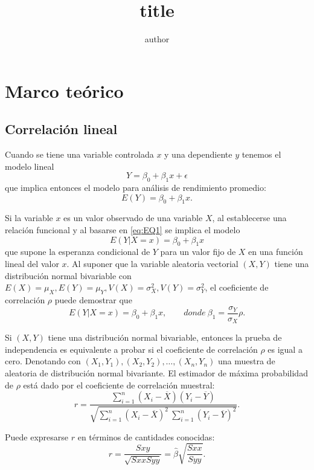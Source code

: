 \documentclass[12pt,letterpaper]{article}
\author{author}
\title{title}
\begin{document}
\section {Marco teórico}
\subsection {Correlación lineal}
Cuando se tiene una variable controlada $x$ y una dependiente $y$ tenemos el modelo lineal
\begin{equation}
Y=\beta_0+\beta_1x+\epsilon
\end{equation}
que implica entonces el modelo para análisis de rendimiento promedio:
\begin{equation}\label{eq:EQ1}
E(Y)=\beta_0+\beta_1x.
\end{equation}

Si la variable $x$ es un valor observado de una variable $X$, al establecerse una relación funcional y al basarse en \eqref{eq:EQ1}
se implica el modelo
\begin{equation}
E(Y|X=x)=\beta_0+\beta_1x
\end{equation}
que supone la esperanza condicional de $Y$ para un valor fijo de $X$ en una función lineal del valor $x$. Al suponer que la variable aleatoria vectorial $(X, Y)$ tiene una distribución normal bivariable con $E(X)=\mu_X, E(Y)=\mu_Y, V(X)=\sigma^2_X, V(Y)=\sigma^2_Y$, el coeficiente de correlación $\rho$ puede demostrar que
\begin{equation}
E(Y|X=x)=\beta_0+\beta_1x,\qquad donde\ \beta_1=\frac{\sigma_Y}{\sigma_X}\rho.
\end{equation}


Si $(X, Y)$ tiene una distribución normal bivariable, entonces la prueba de independencia es equivalente a probar si el coeficiente de correlación $\rho$ es igual a cero. Denotando con $(X_1, Y_1), (X_2, Y_2),\ldots , (X_n, Y_n)$ una muestra de aleatoria de distribución normal bivariante. El estimador de máxima probabilidad de $\rho$ está dado por el coeficiente de correlación muestral:
\begin{equation}
r=\frac{\sum_{i=1}^{n}(X_i-\overline{X})(Y_i-\overline{Y})}{\sqrt{\sum_{i=1}^{n}(X_i-\overline{X})^2\ \sum_{i=1}^{n}(Y_i-\overline{Y})^2}}.
\end{equation}

Puede expresarse $r$ en términos de cantidades conocidas:
\begin{equation}
r=\frac{S{xy}}{\sqrt{S{xx}S{yy}}}=\hat{\beta}\sqrt{\frac{S{xx}}{S{yy}}}.
\end{equation}
\end{document}
